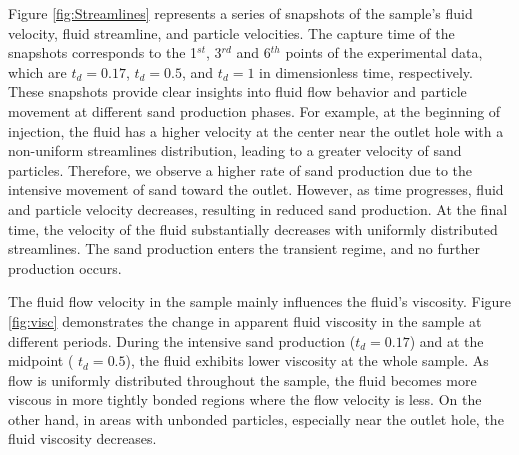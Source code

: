 \documentclass{article}
\begin{document}
Figure \ref{fig:Streamlines} represents a series of snapshots of the sample's fluid velocity, fluid streamline, and particle velocities. The capture time of the snapshots corresponds to the 1$^{st}$, 3$^{rd}$ and 6$^{th}$ points of the experimental data, which are $t_d = 0.17$, $t_d = 0.5$, and $t_d = 1$ in dimensionless time, respectively. These snapshots provide clear insights into fluid flow behavior and particle movement at different sand production phases. For example, at the beginning of injection, the fluid has a higher velocity at the center near the outlet hole with a non-uniform streamlines distribution, leading to a greater velocity of sand particles. Therefore, we observe a higher rate of sand production due to the intensive movement of sand toward the outlet. However, as time progresses, fluid and particle velocity decreases, resulting in reduced sand production. At the final time, the velocity of the fluid substantially decreases with uniformly distributed streamlines. The sand production enters the transient regime, and no further production occurs. 

The fluid flow velocity in the sample mainly influences the fluid's viscosity. Figure \ref{fig:visc} demonstrates the change in apparent fluid viscosity in the sample at different periods. During the intensive sand production  ($t_d = 0.17$) and at the midpoint ( $t_d = 0.5$),  the fluid exhibits lower viscosity at the whole sample. As flow is uniformly distributed throughout the sample, the fluid becomes more viscous in more tightly bonded regions where the flow velocity is less. On the other hand, in areas with unbonded particles, especially near the outlet hole, the fluid viscosity decreases. 
\end{document}
